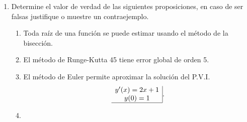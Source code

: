 \documentclass[11pt]{article}
\begin{document}
\begin{enumerate}
\begin{multicols}{2}
\begin{enumerate}
   \item
    	\begin{lstlisting}
        x=[0:0.1:pi]+0.05;
        int=sum(sin(2*x+1))*0.1;
        \end{lstlisting} 
\end{enumerate}
\end{multicols}
\item Determine el valor de verdad de las siguientes proposiciones, en caso de ser falsas justifique o muestre un contraejemplo.
\begin{enumerate}
\item
\fbox{ \begin{minipage}{1cm}   \hfill\vspace{1cm}   		
    \end{minipage} } 
    \begin{minipage}{0.4\textwidth}
	Toda ra\'iz de una funci\'on se puede estimar usando el m\'etodo de la bisecci\'on.
    \end{minipage} 
    \begin{minipage}{0.4\textwidth}
    \end{minipage}
%
\item
\fbox{ \begin{minipage}{1cm}   \hfill\vspace{1cm}   		
    \end{minipage} } 
    \begin{minipage}{0.4\textwidth}
	El m\'etodo de Runge-Kutta 45 tiene error global de orden 5.
    \end{minipage} 
    \begin{minipage}{0.4\textwidth}
    \end{minipage}
%
\item
\fbox{ \begin{minipage}{1cm}   \hfill\vspace{1cm}   		
    \end{minipage} } 
    \begin{minipage}{0.4\textwidth}
	El método de Euler permite aproximar la soluci\'on del P.V.I. 
    $$
    \begin{array}{c|}
    y'(x)=2x+1\\
    y(0)=1\\ \hline
    \end{array}.
    $$
    \end{minipage} 
    \begin{minipage}{0.4\textwidth}
    \end{minipage}
%
\item

\end{enumerate}
\end{enumerate}
\end{document}
